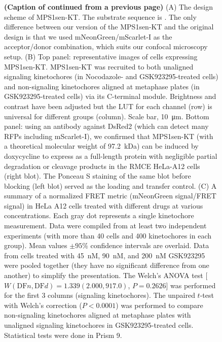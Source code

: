 \begin{figure} [t!]
    \noindent\justifying \textbf{(Caption of  continued from a previous page)} (A) The design scheme of MPS1sen-KT. The  substrate sequence is .
    The only difference between our version of the MPS1sen-KT and the original design \cite{MPS1senor} is that we used mNeonGreen/mScarlet-I as the acceptor/donor combination, which suits our confocal microscopy setup. (B) Top panel: representative images of cells expressing MPS1sen-KT. MPS1sen-KT was recruited to both unaligned signaling kinetochores (in Nocodazole- and GSK923295-treated cells) and non-signaling kinetochores aligned at metaphase plates (in GSK923295-treated cells) via its C-terminal  module. Brightness and contrast have been adjusted but the LUT for each channel (row) is universal for different groups (column). Scale bar, \SI{10}{\micro m}. Bottom panel: using an antibody against DsRed2 (which can detect many RFPs including mScarlet-I), we confirmed that MPS1sen-KT (with a theoretical molecular weight of \SI{97.2}{kDa}) can be induced by doxycycline to express as a full-length protein with negligible partial degradation or cleavage products in the RMCE HeLa-A12 cells (right blot). The Ponceau S staining of the same blot before blocking (left blot) served as the loading and transfer control. (C) A summary of a normalized FRET metric (mNeonGreen signal/FRET signal) in HeLa A12 cells treated with different drugs at various concentrations. Each gray dot represents a single kinetochore measurement. Data were compiled from at least two independent experiments (with more than 40 cells and 400 kinetochores in each group). Mean values $\pm 95\%$ confidence intervals are overlaid. Data from cells treated with \SI{45}{nM}, \SI{90}{nM}, and \SI{200}{nM} GSK923295 were pooled together (they have no significant difference from one another) to simplify the presentation. The Welch's ANOVA test [$W(\text{DF}n, \text{DF}d) = 1.339 (2.000, 917.0)$, $P = 0.2626$] was performed for the first 3 columns (signaling kinetochores). The unpaired $t$-test with Welch's correction ($P < 0.0001$) was performed to compare non-signaling kinetochores aligned at metaphase plates with unaligned signaling kinetochores in GSK923295-treated cells. Statistical tests were done in Prism 9.
\end{figure}

